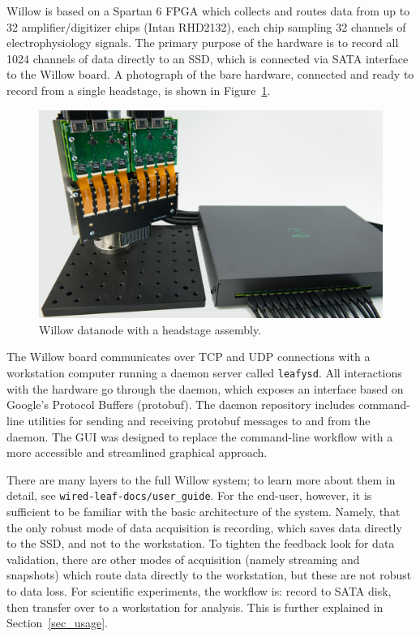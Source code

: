 Willow is based on a Spartan 6 FPGA which collects and routes data from up to 32 amplifier/digitizer chips (Intan RHD2132), each chip sampling 32 channels of electrophysiology signals. The primary purpose of the hardware is to record all 1024 channels of data directly to an SSD, which is connected via SATA interface to the Willow board. A photograph of the bare hardware, connected and ready to record from a single headstage, is shown in Figure~\ref{fig_hw}.

\begin{figure}[h!]
\begin{center}
\includegraphics[width=12cm]{screenshots/willow_photoshoot_downsampled.jpg}
\end{center}
\caption{Willow datanode with a headstage assembly.}
\label{fig_hw}
\end{figure}

The Willow board communicates over TCP and UDP connections with a workstation computer running a daemon server called \texttt{leafysd}. All interactions with the hardware go through the daemon, which exposes an interface based on Google's Protocol Buffers (protobuf). The daemon repository includes command-line utilities for sending and receiving protobuf messages to and from the daemon. The GUI was designed to replace the command-line workflow with a more accessible and streamlined graphical approach.

There are many layers to the full Willow system; to learn more about them in detail, see \texttt{wired-leaf-docs/user\_guide}. For the end-user, however, it is sufficient to be familiar with the basic architecture of the system. Namely, that the only robust mode of data acquisition is recording, which saves data directly to the SSD, and not to the workstation. To tighten the feedback look for data validation, there are other modes of acquisition (namely streaming and snapshots) which route data directly to the workstation, but these are not robust to data loss. For scientific experiments, the workflow is: record to SATA disk, then transfer over to a workstation for analysis. This is further explained in Section~\ref{sec_usage}.

